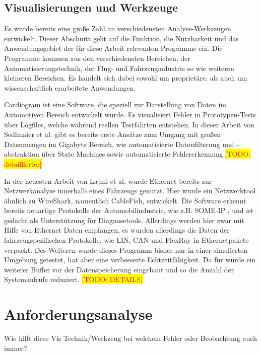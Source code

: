 \documentclass[draft=false
              ,paper=a4
              ,twoside=false
              ,fontsize=11pt
              ,headsepline
              ,BCOR10mm
              ,DIV11
              ]{scrbook}
\newcommand{\TODO}[1]{\colorbox{yellow}{\textcolor{red}{[TODO: #1]}}}
\begin{document}
\section{Visualisierungen und Werkzeuge} %
\label{sec:anwendungen_und_werkzeuge}
Es wurde bereits eine große Zahl an verschiedensten Analyse-Werkzeugen entwickelt. Dieser Abschnitt geht auf die Funktion, die Nutzbarkeit und das Anwendungsgebiet der für diese Arbeit relevanten Programme ein. Die Programme kommen aus den verschiedensten Bereichen, der Automatisierungstechnik, der Flug- und Fahrzeugindustrie so wie weiteren kleineren Bereichen. Es handelt sich dabei sowohl um proprietäre, als auch um wissenschaftlich erarbeitete Anwendungen. 

Cardiogram \cite{sedlmair_cardiogram:_2011} ist eine Software, die speziell zur Darstellung von Daten im Automotiven Bereich entwickelt wurde. Es visualisiert Fehler in Prototypen-Tests über Logfiles, welche während reellen Testfahrten entstehen. In dieser Arbeit von Sedlmaier et al. gibt es bereits erste Ansätze zum Umgang mit großen Datenmengen im Gigabyte Bereich, wie automatisierte Datenfilterung und -abstraktion über State Machines sowie automatisierte Fehlererkennung.\TODO{detaillierter}


In der neuesten Arbeit von Lajmi et al. \cite{lajmi_using_2013} wurde Ethernet bereits zur Netzwerkanalyse innerhalb eines Fahrzeugs genutzt. Hier wurde ein Netzwerktool ähnlich zu WireShark, namentlich CableFish, entwickelt. Die Software erkennt bereits neuartige Protokolle der Automobilindustrie, wie z.B. SOME-IP \cite{someip_scalable_2014}, und ist gedacht als Unterstützung für Diagnosetools. Allerdings werden hier zwar mit Hilfe von Ethernet Daten empfangen, es wurden allerdings die Daten der fahrzeugspezifischen Protokolle, wie LIN, CAN und FlexRay in Ethernetpakete verpackt. Des Weiteren wurde dieses Programm bisher nur in einer simulierten Umgebung getestet, hat aber eine verbesserte Echtzeitfähigkeit. Da für wurde ein weiterer Buffer vor der Datenspeicherung eingebaut und so die Anzahl der Systemaufrufe reduziert. \TODO{DETAILS}

\chapter{Anforderungsanalyse} %
\label{cha:anforderungsanalyse}
Wie hilft diese Vis Technik/Werkzeug bei welchem Fehler oder Beobachtung auch immer?
\end{document}
